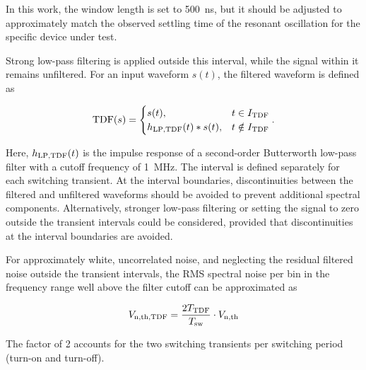 In this work, the window length  is set to \SI{500}{ns}, but it should be adjusted to approximately match the observed settling time of the resonant oscillation for the specific device under test.

Strong low-pass filtering is applied outside this interval, while the signal within it remains unfiltered.
For an input waveform $s(t)$, the filtered waveform is defined as

\begin{equation}
	\text{TDF}(s) =
	\begin{cases}
		s(t), & t \in {I}_{\mathrm{TDF}} \\
		{h}_{\mathrm{LP,TDF}}(t)\ast s(t), & t \notin {I}_{\mathrm{TDF}}
	\end{cases}.
\end{equation}

Here, ${h}_{\mathrm{LP,TDF}}(t)$ is the impulse response of a second-order Butterworth low-pass filter with a cutoff frequency of \SI{1}{MHz}.
The interval is defined separately for each switching transient.
At the interval boundaries, discontinuities between the filtered and unfiltered waveforms should be avoided to prevent additional spectral components.
Alternatively, stronger low-pass filtering or setting the signal to zero outside the transient intervals could be considered, provided that discontinuities at the interval boundaries are avoided.

For approximately white, uncorrelated noise, and neglecting the residual filtered noise outside the transient intervals, the RMS spectral noise per bin in the frequency range well above the filter cutoff can be approximated as

\begin{equation}
	{V}_{\mathrm{n,th,TDF}} = \frac{2{T}_{\mathrm{TDF}}}{{T}_{\mathrm{sw}}} \cdot {V}_{\mathrm{n,th}}
\end{equation}

The factor of 2 accounts for the two switching transients per switching period (turn-on and turn-off).